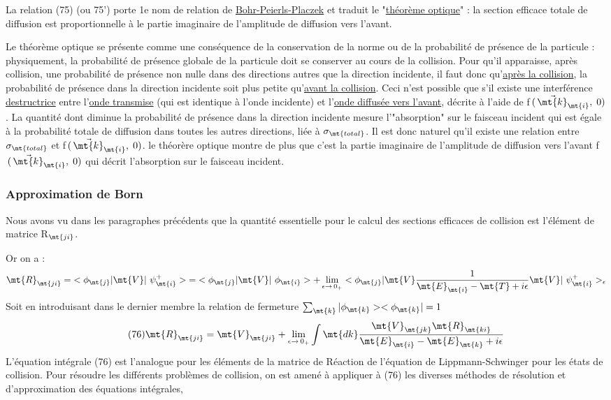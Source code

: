 La relation (75) (ou 75') porte 1e nom de relation de
\ul{Bohr-Peierls-Placzek} et traduit le "\ul{théorème optique}" : la section
efficace totale de diffusion est proportionnelle à le partie imaginaire de
l'amplitude de diffusion vers l'avant.

Le théorème optique se présente comme une conséquence
de la conservation de la norme ou de la probabilité de présence de la
particule : physiquement, la probabilité de présence globale de la particule
doit se conserver au cours de la collision. Pour qu'il apparaisse,
après collision, une probabilité de présence non nulle dans des directions
autres que la direction incidente, il faut donc qu'\ul{après la collision}, la
probabilité de présence dans la direction incidente soit plus petite
qu'\ul{avant la collision}. Ceci n'est possible que s'il existe une interférence
\ul{destructrice} entre l'\ul{onde transmise} (qui est identique à l'onde
incidente) et l'\ul{onde diffusée vers l'avant}, décrite à l'aide de
f$\,(\,\vec{\mt{k}}_\mt{i},\;0)$. La quantité dont diminue la probabilité de présence dans la
direction incidente mesure l'"absorption" sur le faisceau incident qui
est égale à la probabilité totale de diffusion dans toutes les autres
directions, liée à $\sigma_\mt{total}$. Il est donc naturel qu'il existe une relation
entre $\sigma_\mt{total}$ et f$\,(\,\vec{\mt{k}}_\mt{i},\;0)$. le théorère optique montre de
plus que c'est la partie imaginaire de l'amplitude de diffusion vers l'avant f$\,(\,\vec{\mt{k}}_\mt{i},\;0)$ qui
décrit l'absorption sur le faisceau incident.
\subsubsection{Approximation de Born}%
Nous avons vu dans les paragraphes précédents que la quantité
essentielle pour le calcul des sections efficaces de collision est l'élément de
matrice R$_\mt{ji}$.

Or on a :
\[
\mt{R}_\mt{ji}=\;<\phi_\mt{j }|\mt{ V }|\ \psi_\mt{i}^+>\;=\;<\phi_\mt{j }|\mt{ V }|\ \phi_\mt{i}>+
\lim_{\epsilon\to\,0_+}<\phi_\mt{j }|\mt{ V }
\frac{1}{\mt{E}_\mt{i}-\mt{T}+i\epsilon}\mt{ V }|\ \psi_\mt{i}^+>_\epsilon
\]
Soit en introduisant dans le dernier membre la relation de fermeture $\sum_\mt{k}|\phi_\mt{k }><\phi_\mt{k}|=1$
\[
\tag{76}\mt{R}_\mt{ji}=\mt{ V}_\mt{ji}+
\lim_{\epsilon\to\,0_+}\int\mt{dk }
\frac{\mt{V}_\mt{jk}\mt{ R}_\mt{ki}}{\mt{E}_\mt{i}-\mt{E}_\mt{k}+i\epsilon}
\]
L'équation intégrale (76) est l'analogue pour les éléments de la matrice
de Réaction de l'équation de Lippmann-Schwinger pour les états de collision.
Pour résoudre les différents problèmes de collision, on est amené à appliquer à
(76) les diverses méthodes de résolution et d'approximation des
équations intégrales,

